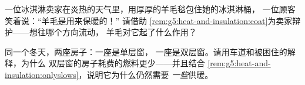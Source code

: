 \begin{exercise}[$\star\star$]\label{exo:g5:heat-and-insulation:10}
一位冰淇淋卖家在炎热的天气里，用厚厚的羊毛毯包住她的冰淇淋桶，
一位顾客笑着说：“羊毛是用来保暖的！”
请借助
\cref{rem:g5:heat-and-insulation:coat}为卖家辩护——想往哪个方向流动，
羊毛对它起了什么作用？
\end{exercise}

\begin{exercise}[$\star\star$]\label{exo:g5:heat-and-insulation:11}
同一个冬天，两座房子：一座是单层窗，
一座是双层窗。请用车道和被困住的解释，为什么
双层窗的房子耗费的燃料更少——并且结合
\cref{rem:g5:heat-and-insulation:onlyslows}，说明它为什么仍然需要
\emph{一些}供暖。
\end{exercise}
